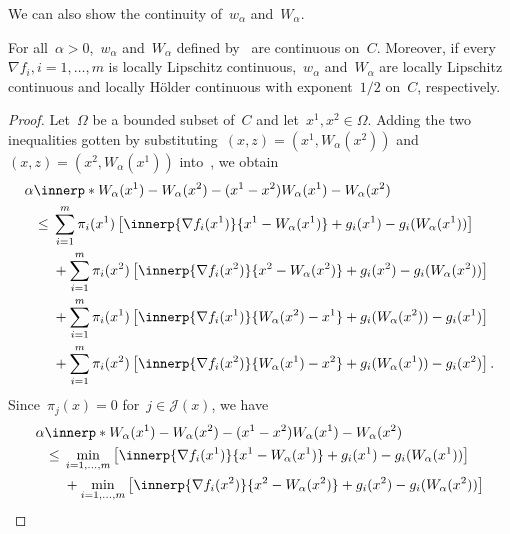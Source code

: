 \documentclass[../../main]{subfiles}
\begin{document}
            We can also show the continuity of~$w_\alpha$ and~$W_\alpha$.
            \begin{theorem} 
                For all~$\alpha > 0$,~$w_\alpha$ and~$W_\alpha$ defined by~ are continuous on~$C$.
                Moreover, if every~$\nabla f_i, i = 1, \dots, m$ is locally Lipschitz continuous,~$w_\alpha$ and~$W_\alpha$ are locally Lipschitz continuous and locally H\"older continuous with exponent~$1 / 2$ on~$C$, respectively.
            \end{theorem}
            \begin{proof}
                Let~$\Omega$ be a bounded subset of~$C$ and let~$x^1, x^2 \in \Omega$.
                Adding the two inequalities gotten by substituting~$(x, z) = (x^1, W_\alpha(x^2))$ and~$(x, z) = (x^2, W_\alpha(x^1))$ into~, we obtain
                \begin{align}
                    \MoveEqLeft \alpha \innerp*{W_\alpha(x^1) - W_\alpha(x^2) - (x^1 - x^2)}{W_\alpha(x^1) - W_\alpha(x^2)} \\
                    \le{}& \sum_{i = 1}^{m} \pi_i(x^1)\left[ \innerp{\nabla f_i(x^1)}{x^1 - W_\alpha(x^1)} + g_i(x^1) - g_i(W_\alpha(x^1)) \right] \\
                         &+ \sum_{i = 1}^{m} \pi_i(x^2) \left[ \innerp{\nabla f_i(x^2)}{x^2 - W_\alpha(x^2)} + g_i(x^2) - g_i(W_\alpha(x^2)) \right] \\
                         &+ \sum_{i = 1}^{m} \pi_i(x^1) \left[ \innerp{\nabla f_i(x^1)}{W_\alpha(x^2) - x^1} + g_i(W_\alpha(x^2)) - g_i(x^1) \right] \\
                         &+ \sum_{i = 1}^{m} \pi_i(x^2) \left[ \innerp{\nabla f_i(x^2)}{W_\alpha(x^1) - x^2} + g_i(W_\alpha(x^1)) - g_i(x^2) \right]
                .\end{align}
                Since~$\pi_j(x) = 0$ for~$j \in \mathcal{J}(x)$, we have
                \begin{align}
                    \MoveEqLeft \alpha \innerp*{W_\alpha(x^1) - W_\alpha(x^2) - (x^1 - x^2)}{W_\alpha(x^1) - W_\alpha(x^2)} \\
                    \le{}& \min_{i = 1, \dots, m} \left[ \innerp{\nabla f_i(x^1)}{x^1 - W_\alpha(x^1)} + g_i(x^1) - g_i(W_\alpha(x^1)) \right] \\
                         &+ \min_{i = 1, \dots, m} \left[ \innerp{\nabla f_i(x^2)}{x^2 - W_\alpha(x^2)} + g_i(x^2) - g_i(W_\alpha(x^2)) \right] \\

\end{align}
\end{proof}
\end{document}
